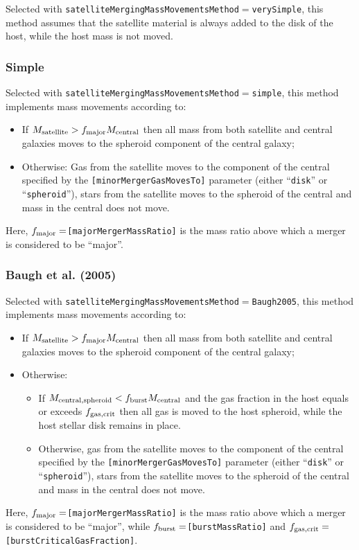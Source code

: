 Selected with {\tt satelliteMergingMassMovementsMethod}$=${\tt verySimple}, this method assumes that the satellite material is always added to the disk of the host, while the host mass is not moved.

\subsubsection{Simple}

Selected with {\tt satelliteMergingMassMovementsMethod}$=${\tt simple}, this method implements mass movements according to:
\begin{itemize}
 \item If $M_{\rm satellite} > f_{\rm major} M_{\rm central}$ then all mass from both satellite and central galaxies moves to the spheroid \gls{component} of the central galaxy;
 \item Otherwise: Gas from the satellite moves to the \gls{component} of the central specified by the {\tt [minorMergerGasMovesTo]} parameter (either ``{\tt disk}'' or ``{\tt spheroid}''), stars from the satellite moves to the spheroid of the central and mass in the central does not move.
\end{itemize}
Here, $f_{\rm major}=${\tt [majorMergerMassRatio]} is the mass ratio above which a merger is considered to be ``major''.

\subsubsection{Baugh et al. (2005)}

Selected with {\tt satelliteMergingMassMovementsMethod}$=${\tt Baugh2005}, this method implements mass movements according to:
\begin{itemize}
 \item If $M_{\rm satellite} > f_{\rm major} M_{\rm central}$ then all mass from both satellite and central galaxies moves to the spheroid \gls{component} of the central galaxy;
 \item Otherwise:
 \begin{itemize}
  \item If $M_{\rm central, spheroid} < f_{\rm burst} M_{\rm central}$ and the gas fraction in the host equals or exceeds $f_{\rm gas,crit}$ then all gas is moved to the host spheroid, while the host stellar disk remains in place.
  \item Otherwise, gas from the satellite moves to the \gls{component} of the central specified by the {\tt [minorMergerGasMovesTo]} parameter (either ``{\tt disk}'' or ``{\tt spheroid}''), stars from the satellite moves to the spheroid of the central and mass in the central does not move.
 \end{itemize}
\end{itemize}
Here, $f_{\rm major}=${\tt [majorMergerMassRatio]} is the mass ratio above which a merger is considered to be ``major'', while $f_{\rm burst}=${\tt [burstMassRatio]} and $f_{\rm gas,crit}=${\tt [burstCriticalGasFraction]}.

